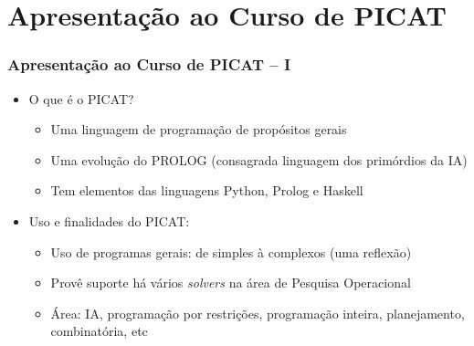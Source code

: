 \section{Apresentação ao Curso de PICAT}



\begin{frame}[fragile]

  \frametitle{Apresentação ao Curso de PICAT -- I}
  \begin{itemize}
    \item O que é o PICAT?
    \pause
       \begin{itemize}
			\item Uma linguagem de programação de propósitos gerais
			\item Uma evolução do PROLOG (consagrada linguagem dos primórdios da IA)
			\item Tem elementos das linguagens Python, Prolog e Haskell
		\end{itemize}

    \item Uso e finalidades do PICAT:
    \pause
       \begin{itemize}
			\item Uso de programas gerais: de simples à complexos (uma reflexão)
			\item Provê suporte há vários \textit{solvers} na área de Pesquisa Operacional
			\item Área: IA, programação por restrições, programação inteira, planejamento,
			combinatória, etc
		\end{itemize}

   \end{itemize}

  \end{frame}
    
